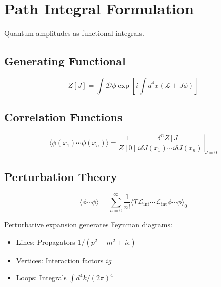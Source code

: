 \section{Path Integral Formulation}

Quantum amplitudes as functional integrals.

\subsection{Generating Functional}

\begin{definition}
\label{fa_21:def:path-integral}
\begin{equation}
Z[J] = \int \mathcal{D}\phi \exp\left[i\int d^4x(\mathcal{L} + J\phi)\right]
\end{equation}
\end{definition}

\subsection{Correlation Functions}

\begin{theorem}
\label{fa_21:thm:n-point}
\begin{equation}
\langle\phi(x_1)\cdots\phi(x_n)\rangle = \frac{1}{Z[0]}\left.\frac{\delta^n Z[J]}{i\delta J(x_1)\cdots i\delta J(x_n)}\right|_{J=0}
\end{equation}
\end{theorem}

\subsection{Perturbation Theory}

\begin{equation}
\langle\phi\cdots\phi\rangle = \sum_{n=0}^\infty \frac{1}{n!}\langle T\mathcal{L}_{\text{int}}\cdots\mathcal{L}_{\text{int}}\phi\cdots\phi\rangle_0
\end{equation}

\begin{proposition}
\label{fa_21:prop:feynman}
Perturbative expansion generates Feynman diagrams:
\begin{itemize}
\item Lines: Propagators $1/(p^2 - m^2 + i\epsilon)$
\item Vertices: Interaction factors $ig$
\item Loops: Integrals $\int d^4k/(2\pi)^4$
\end{itemize}
\end{proposition}


